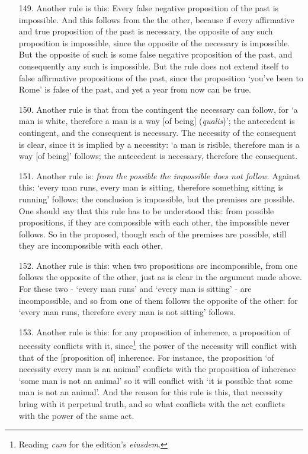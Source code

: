 \documentclass[]{article}
\begin{document}
\begin{itemize}
\item[149.] Another rule is this: Every false negative proposition of the past is impossible. And this follows from the the other, because if every affirmative and true proposition of the past is necessary, the opposite of any such proposition is impossible, since the opposite of the necessary is impossible. But the opposite of such is some false negative proposition of the past, and consequently any such is impossible. But the rule does not extend itself to false affirmative propositions of the past, since the proposition `you've been to Rome' is false of the past, and yet a year from now can be true. 
\item[150.] Another rule is that from the contingent the necessary can follow, for `a man is white, therefore a man is a way [of being] (\textit{qualis})'; the antecedent is contingent, and the consequent is necessary. The necessity of the consequent is clear, since it is implied by a necessity: `a man is risible, therefore man is a way [of being]' follows; the antecedent is necessary, therefore the consequent.
\item[151.] Another rule is: \textit{from the possible the impossible does not follow}. Against this: `every man runs, every man is sitting, therefore something sitting is running' follows; the conclusion is impossible, but the premises are possible. One should say that this rule has to be understood this: from possible propositions, if they are compossible with each other, the impossible never follows. So in the proposed, though each of the premises are possible, still they are incompossible with each other.
\item[152.] Another rule is this: when two propositions are incompossible, from one follows the opposite of the other, just as is clear in the argument made above. For these two - `every man runs' and `every man is sitting' - are incompossible, and so from one of them follows the opposite of the other: for `every man runs, therefore every man is not sitting' follows. 
\item[153.] Another rule is this: for any proposition of inherence, a proposition of necessity conflicts with it, since\footnote{Reading \textit{cum} for the edition's \textit{eiusdem}.} the power of the necessity will conflict with that of the [proposition of] inherence. For instance, the proposition `of necessity every man is an animal' conflicts with the proposition of inherence `some man is not an animal' so it will conflict with `it is possible that some man is not an animal'. And the reason for this rule is this, that necessity bring with it perpetual truth, and so what conflicts with the act conflicts with the power of the same act.

\end{itemize}
\end{document}
